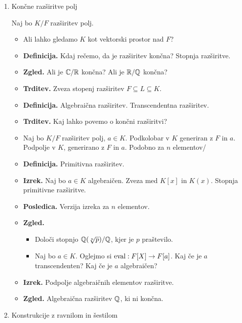 \begin{enumerate}
    \item Končne razširitve polj 
    
    Naj bo \(K/F\) razširitev polj.
    \begin{itemize}
        \item Ali lahko gledamo \(K\) kot vektorski prostor nad \(F\)?
        \item \textbf{Definicija.} Kdaj rečemo, da je razširitev končna? Stopnja razširitve.
        \item \textbf{Zgled.} Ali je \(\mathbb{C}/\mathbb{R}\) končna? Ali je \(\mathbb{R}/\mathbb{Q}\) končna?
        \item \textbf{Trditev.} Zveza stopenj razširitev \(F \subseteq L \subseteq K\).
        \item \textbf{Definicija.} Algebraična razširitev. Transcendentna razširitev.
        \item \textbf{Trditev.} Kaj lahko povemo o končni razširitvi?
        \item Naj bo \(K/F\) razširitev polj, \(a \in K\). Podkolobar v \(K\) generiran z \(F\) in \(a\). Podpolje v \(K\), generirano z \(F\) in \(a\). Podobno za \(n\) elementov/
        \item \textbf{Definicija.} Primitivna razširitev.
        \item \textbf{Izrek.} Naj bo \(a \in K\) algebraičen. Zveza med \(K[x]\) in \(K(x)\). Stopnja primitivne razširitve.
        \item \textbf{Posledica.} Verzija izreka za \(n\) elementov.
        \item \textbf{Zgled.}
        \begin{itemize}
            \item Določi stopnjo \(\mathbb{Q}(\sqrt[n]{p})/\mathbb{Q}\), kjer je \(p\) praštevilo. 
            \item Naj bo \(a \in K\). Oglejmo si \(\operatorname{eval}: F[X] \to F[a]\). Kaj če je \(a\) transcendenten? Kaj če je \(a\) algebraičen?
        \end{itemize}
        \item \textbf{Izrek.} Podpolje algebraičnih elementov razširitve.
        \item \textbf{Zgled.} Algebraična razširitev \(\mathbb{Q}\), ki ni končna.
    \end{itemize}

    \item Konstrukcije z ravnilom in šestilom
    


\end{enumerate}
